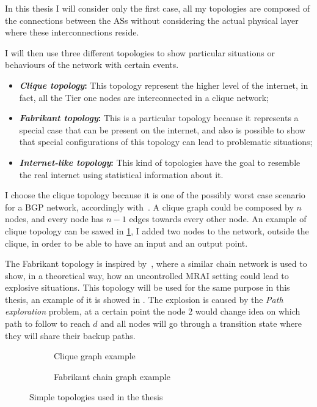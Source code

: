 In this thesis I will consider only the first case, all my topologies are composed of
the connections between the \acp{AS} without considering the actual physical layer
where these interconnections reside.

I will then use three different topologies to show particular situations or
behaviours of the network with certain events.
\begin{itemize}
	\item \textbf{\textit{Clique topology}:} This topology represent the higher
		level of the internet, in fact, all the Tier one nodes are interconnected
		in a clique network;
	\item \textbf{\textit{Fabrikant topology}:} This is a particular topology
		because it represents a special case that can be present on the internet,
		and also is possible to show that special configurations of this topology
		can lead to problematic situations;
	\item \textbf{\textit{Internet-like topology}:} This kind of topologies
		have the goal to resemble the real internet using statistical information
		about it.
\end{itemize}

I choose the clique topology because it is one of the possibly worst
case scenario for a \ac{BGP} network, accordingly with~\cite{labovitz2000delayed}.
A clique graph could be composed by $n$ nodes, and every node has
$n-1$ edges towards every other node.
An example of clique topology can be sawed in \cref{fig:clique_topology}, I added
two nodes to the network, outside the clique, in order to be able to have an
input and an output point.

The Fabrikant topology is inspired by~\cite{fabrikant2011there}, where
a similar chain network is used to show, in a theoretical way, how an uncontrolled
\ac{MRAI} setting could lead to explosive situations.
This topology will be used for the same purpose in this thesis, an example
of it is showed in .
The explosion is caused by the \textit{Path exploration} problem, at a certain
point the node \num{2} would change idea on which path to follow to reach $d$
and all nodes will go through a transition state where they will
share their backup paths.

\begin{figure}[ht]
     \centering
     \begin{subfigure}[b]{0.45\textwidth}
         \centering
		 
		 \caption{Clique graph example}
    	 \label{fig:clique_topology}
     \end{subfigure}
     \hfill
     \begin{subfigure}[b]{0.45\textwidth}
         \centering
         
		 \caption{Fabrikant chain graph example}
		 \label{fig:fabrikant_topology}
     \end{subfigure}
		\caption{Simple topologies used in the thesis}
        \label{fig:clique_and_fabrikant}
\end{figure}

